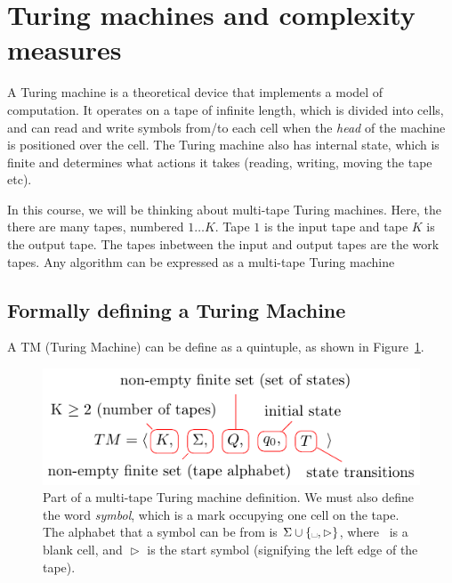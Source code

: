 
\section{Turing machines and complexity measures}

A Turing machine is a theoretical device that implements a model of computation.
It operates on a tape of infinite length, which is divided into cells, and can
read and write symbols from/to each cell when the \textit{head} of the machine
is positioned over the cell. The Turing machine also has internal state, which
is finite and determines what actions it takes (reading, writing, moving the
tape etc).

In this course, we will be thinking about multi-tape Turing machines. Here, the
there are many tapes, numbered $1 \dots K$. Tape $1$ is the input tape and tape
$K$ is the output tape. The tapes inbetween the input and output tapes are the
work tapes. Any algorithm can be expressed as a multi-tape Turing machine

\subsection{Formally defining a Turing Machine}

A TM (Turing Machine) can be define as a quintuple, as shown in
Figure~\ref{fig:tm-definition}.

\begin{figure}[H]
  \centering
  \includegraphics{equations/tm-definition}
  \caption{Part of a multi-tape Turing machine definition. We must also define
  the word \textit{symbol}, which is a mark occupying one cell on the tape. The
  alphabet that a symbol can be from is $\Sigma \cup \{
  \textrm{\textvisiblespace}, \vartriangleright\}$, where \textvisiblespace~is a
  blank cell, and $\vartriangleright$ is the start symbol (signifying the left
  edge of the tape).}
  \label{fig:tm-definition}
\end{figure}

